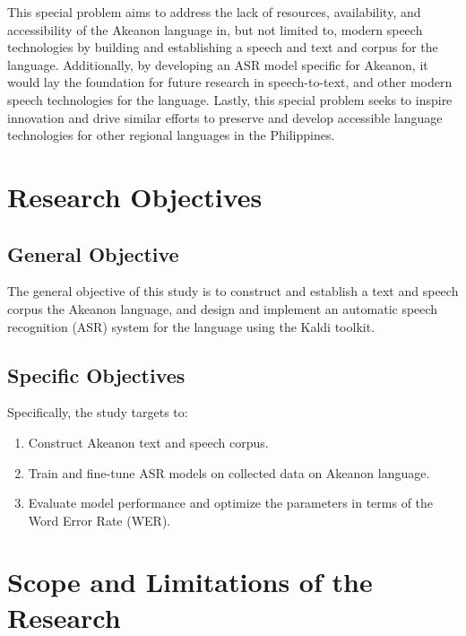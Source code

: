 This special problem aims to address the lack of resources, availability, and accessibility of the Akeanon language in, but not limited to, modern speech technologies by building and establishing a speech and text and corpus for the language. Additionally, by developing an ASR model specific for Akeanon, it would lay the foundation for future research in speech-to-text, and other modern speech technologies for the language. Lastly, this special problem seeks to inspire innovation and drive similar efforts to preserve and develop accessible language technologies for other regional languages in the Philippines.

\section{Research Objectives}
\label{sec:researchobjectives}

\subsection{General Objective}
\label{sec:generalobjective}

The general objective of this study is to construct and establish a text and speech corpus the Akeanon language, and design and implement an automatic speech recognition (ASR) system for the language using the Kaldi toolkit.


\subsection{Specific Objectives}
\label{sec:specificobjectives}

Specifically, the study targets to:
\begin{enumerate}
    \item Construct Akeanon text and speech corpus.
    \item Train and fine-tune ASR models on collected data on Akeanon language.
    \item Evaluate model performance and optimize the parameters in terms of the Word Error Rate (WER).
 \end{enumerate}
 
\section{Scope and Limitations of the Research}
\label{sec:scopelimitations}

